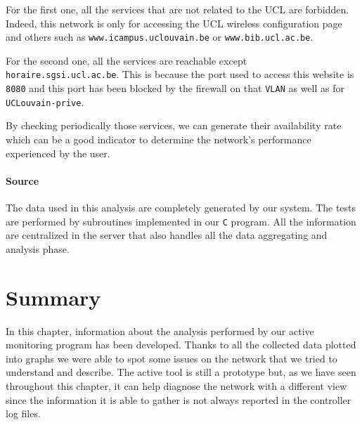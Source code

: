 For the first one, all the services that are not related to the UCL are forbidden. Indeed, this network is only for accessing the UCL wireless configuration page and others such as \texttt{www.icampus.uclouvain.be} or \texttt{www.bib.ucl.ac.be}.

For the second one, all the services are reachable except \texttt{horaire.sgsi.ucl.ac.be}. This is because the port used to access this website is \texttt{8080} and this port has been blocked by the firewall on that \texttt{VLAN} as well as for \texttt{UCLouvain-prive}.

By checking periodically those services, we can generate their availability rate which can be a good indicator to determine the network's performance experienced by the user.


\paragraph*{Source} The data used in this analysis are completely generated by our system. The tests are performed by subroutines implemented in our \texttt{C} program. All the information are centralized in the server that also handles all the data aggregating and analysis phase.



\section{Summary}
In this chapter, information about the analysis performed by our active monitoring program has been developed. Thanks to all the collected data plotted into graphs we were able to spot some issues on the network that we tried to understand and describe. The active tool is still a prototype but, as we have seen throughout this chapter, it can help diagnose the network with a different view since the information it is able to gather is not always reported in the controller log files.
